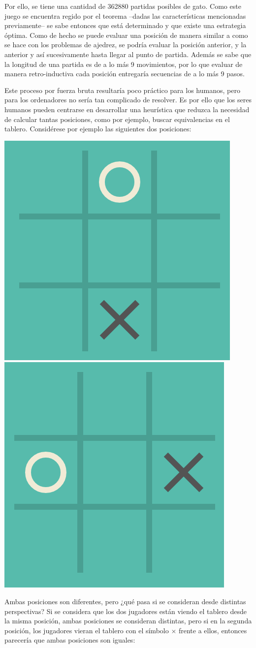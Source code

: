 \documentclass[twoside,openright,12pt,a4paper,spanish]{book}
\begin{document}
Por ello, se tiene una cantidad de 362880 partidas posibles de gato. Como este juego se encuentra regido por el teorema --dadas las características mencionadas previamente-- se sabe entonces que está determinado y que existe una estrategia \'optima. Como de hecho se puede evaluar una posición de manera similar a como se hace con los problemas de ajedrez, se podría evaluar la posición anterior, y la anterior y así sucesivamente hasta llegar al punto de partida. Además se sabe que la longitud de una partida es de a lo más 9 movimientos, por lo que evaluar de manera retro-inductiva cada posición entregaría secuencias de a lo más 9 pasos.

Este proceso por fuerza bruta resultaría poco práctico para los humanos, pero para los ordenadores no sería tan complicado de resolver. Es por ello que los seres humanos pueden centrarse en desarrollar una heurística que reduzca la necesidad de calcular tantas posiciones, como por ejemplo, buscar equivalencias en el tablero. Considérese por ejemplo las siguientes dos posiciones: 

\begin{center}
    \includegraphics[width=5.0 cm,height=5.0 cm]{gato1.png} \hspace{20pt}
    \includegraphics[width=5.0 cm,height=5.0 cm]{gato2.png}
\end{center}

Ambas posiciones son diferentes, pero ¿qué pasa si se consideran desde distintas perspectivas? Si se considera que los dos jugadores están viendo el tablero desde la misma posici\'on, ambas posiciones se consideran distintas, pero si en la segunda posición, los jugadores vieran el tablero con el símbolo $\times$ frente a ellos, entonces parecería que ambas posiciones son iguales:
\end{document}
